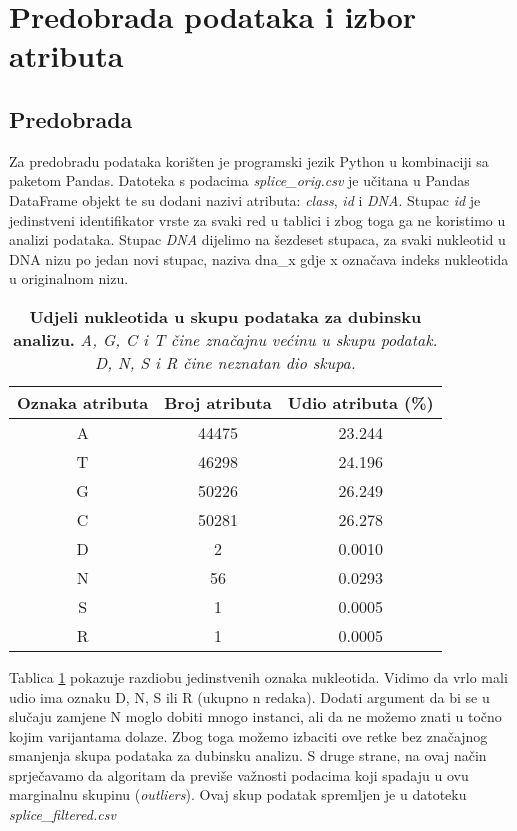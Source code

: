 \section{Predobrada podataka i izbor atributa}
\label{ch:ch3}

\subsection{Predobrada}
Za predobradu podataka korišten je programski jezik Python u kombinaciji sa paketom Pandas. Datoteka s podacima \textit{splice\_orig.csv} je učitana u Pandas DataFrame objekt te su dodani nazivi atributa: \textit{class}, \textit{id} i \textit{DNA}. Stupac \textit{id} je jedinstveni identifikator vrste za svaki red u tablici i zbog toga ga ne koristimo u analizi podataka. Stupac \textit{DNA} dijelimo na šezdeset stupaca, za svaki nukleotid u DNA nizu po jedan novi stupac, naziva dna\_x gdje x označava indeks nukleotida u originalnom nizu.

\begin{table}[!ht]
   \caption[Udjeli nukleotida u skupu podataka za dubinsku analizu]{
   \textbf{Udjeli nukleotida u skupu podataka za dubinsku analizu.} \textit{A, G, C i T čine značajnu većinu u skupu podatak. D, N, S i R čine neznatan dio skupa.}}
   \centering
   \begin{tabular}{||c | c | c ||}
   \hline
   Oznaka atributa & Broj atributa & Udio atributa (\%) \\ [0.5ex]
   \hline\hline
   A & 44475 & 23.244 \\
   T & 46298 & 24.196 \\
   G & 50226 & 26.249 \\
   C & 50281 & 26.278 \\
   D & 2  & 0.0010 \\
   N & 56 & 0.0293 \\
   S & 1  & 0.0005 \\
   R & 1  & 0.0005 \\ [1ex]
   \hline
   \end{tabular}
   \label{tab:udjeli}
\end{table}
Tablica \ref{tab:udjeli} pokazuje razdiobu jedinstvenih oznaka nukleotida. Vidimo da vrlo mali udio ima oznaku D, N, S ili R (ukupno n redaka). Dodati argument da bi se u slučaju zamjene N moglo dobiti mnogo instanci, ali da ne možemo znati u točno kojim varijantama dolaze. Zbog toga možemo izbaciti ove retke bez značajnog smanjenja skupa podataka za dubinsku analizu. S druge strane, na ovaj način sprječavamo da algoritam da previše važnosti podacima koji spadaju u ovu marginalnu skupinu (\textit{outliers}). Ovaj skup podatak spremljen je u datoteku \textit{splice\_filtered.csv}

